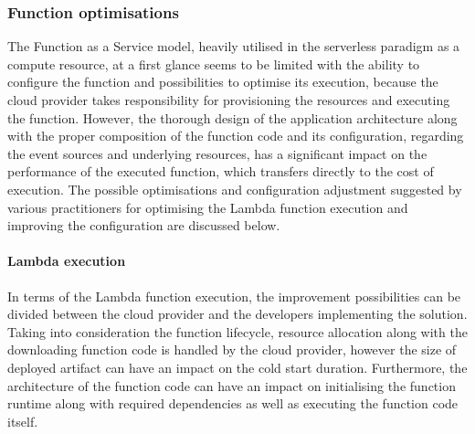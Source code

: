 \subsubsection{Function optimisations}

The Function as a Service model, heavily utilised in the serverless paradigm as a compute resource, at a first glance seems to be limited with the ability to configure the function and possibilities to optimise its execution, because the cloud provider takes responsibility for provisioning the resources and executing the function.
However, the thorough design of the application architecture along with the proper composition of the function code and its configuration, regarding the event sources and underlying resources, has a significant impact on the performance of the executed function, which transfers directly to the cost of execution.
The possible optimisations and configuration adjustment suggested by various practitioners for optimising the Lambda function execution and improving the configuration are discussed below.

\paragraph{Lambda execution}

In terms of the Lambda function execution, the improvement possibilities can be divided between the cloud provider and the developers implementing the solution. Taking into consideration the function lifecycle, resource allocation along with the downloading function code is handled by the cloud provider, however the size of deployed artifact can have an impact on the cold start duration. Furthermore, the architecture of the function code can have an impact on initialising the function runtime along with required dependencies as well as executing the function code itself.

